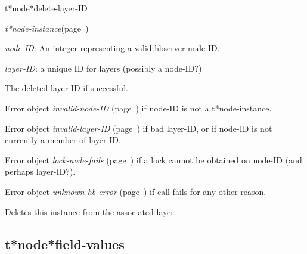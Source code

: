 \begin{description}
\item [Name:]  t*node*delete-layer-ID

\item [Class:] {\sl t*node-instance}\hfill(page~\pageref{t*node-instance})

\item [Parameters:]
\item {\sl node-ID}:   An integer representing
a valid hbserver node ID.

\item {\sl layer-ID}:  a unique ID for layers (possibly a node-ID?)



\item [Return-value:]
The deleted layer-ID if successful.

Error object {\sl invalid-node-ID} (page~\pageref{invalid-node-ID}) if node-ID is
not a t*node-instance.

Error object {\sl invalid-layer-ID} (page~\pageref{invalid-layer-ID}) if bad layer-ID,
or if node-ID is not currently a member of layer-ID.

Error object {\sl lock-node-fails} (page~\pageref{lock-node-fails}) if a lock cannot
be obtained on node-ID (and perhaps layer-ID?).

Error object {\sl unknown-hb-error} (page~\pageref{unknown-hb-error}) if call fails
for any other reason.


\item [Description:]
Deletes this instance from the associated layer.

\item [Public:]



\end{description}
\horizontalline

\subsection{t*node*field-values}
\label{t*node*field-values}

